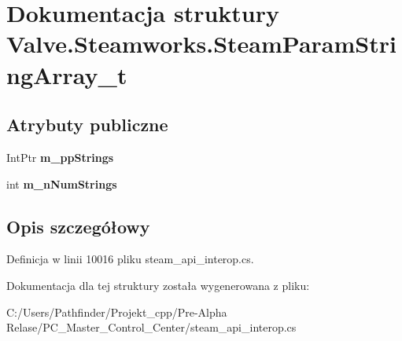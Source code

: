 \hypertarget{struct_valve_1_1_steamworks_1_1_steam_param_string_array__t}{}\section{Dokumentacja struktury Valve.\+Steamworks.\+Steam\+Param\+String\+Array\+\_\+t}
\label{struct_valve_1_1_steamworks_1_1_steam_param_string_array__t}
\subsection*{Atrybuty publiczne}
\begin{DoxyCompactItemize}
\item 
\mbox{\label{struct_valve_1_1_steamworks_1_1_steam_param_string_array__t_acd0f2bad48bc14e2c0774ade3f06ffd4}} 
Int\+Ptr {\bfseries m\+\_\+pp\+Strings}
\item 
\mbox{\label{struct_valve_1_1_steamworks_1_1_steam_param_string_array__t_a13dd1efaadf7361bd7da480035f1d923}} 
int {\bfseries m\+\_\+n\+Num\+Strings}
\end{DoxyCompactItemize}


\subsection{Opis szczegółowy}


Definicja w linii 10016 pliku steam\+\_\+api\+\_\+interop.\+cs.



Dokumentacja dla tej struktury została wygenerowana z pliku\+:\begin{DoxyCompactItemize}
\item 
C\+:/\+Users/\+Pathfinder/\+Projekt\+\_\+cpp/\+Pre-\/\+Alpha Relase/\+P\+C\+\_\+\+Master\+\_\+\+Control\+\_\+\+Center/steam\+\_\+api\+\_\+interop.\+cs\end{DoxyCompactItemize}
